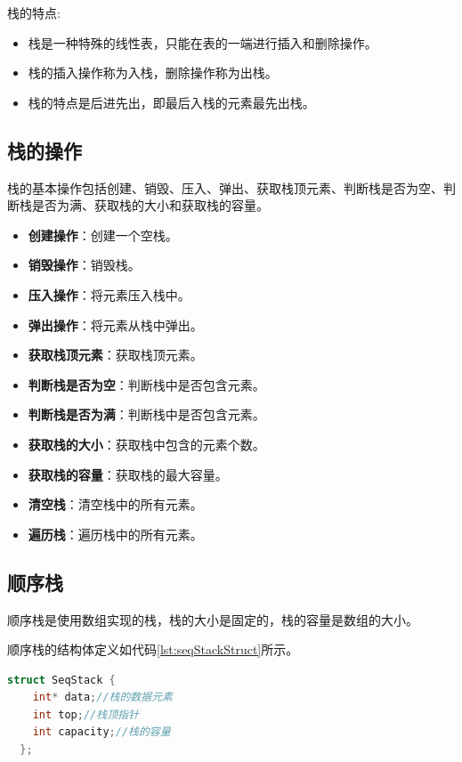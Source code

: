 \documentclass[lang=cn,newtx,10pt,scheme=chinese]{../elegantbook}
\begin{document}
栈的特点:

\begin{itemize}
  \item 栈是一种特殊的线性表，只能在表的一端进行插入和删除操作。
  \item 栈的插入操作称为入栈，删除操作称为出栈。
  \item 栈的特点是后进先出，即最后入栈的元素最先出栈。
\end{itemize}
\subsection{栈的操作}

栈的基本操作包括创建、销毁、压入、弹出、获取栈顶元素、判断栈是否为空、判断栈是否为满、获取栈的大小和获取栈的容量。

\begin{itemize}
  \item \textbf{创建操作}：创建一个空栈。
  \item \textbf{销毁操作}：销毁栈。
  \item \textbf{压入操作}：将元素压入栈中。
  \item \textbf{弹出操作}：将元素从栈中弹出。
  \item \textbf{获取栈顶元素}：获取栈顶元素。
  \item \textbf{判断栈是否为空}：判断栈中是否包含元素。
  \item \textbf{判断栈是否为满}：判断栈中是否包含元素。
  \item \textbf{获取栈的大小}：获取栈中包含的元素个数。
  \item \textbf{获取栈的容量}：获取栈的最大容量。
  \item \textbf{清空栈}：清空栈中的所有元素。
  \item \textbf{遍历栈}：遍历栈中的所有元素。
\end{itemize}


\subsection{顺序栈}

顺序栈是使用数组实现的栈，栈的大小是固定的，栈的容量是数组的大小。

顺序栈的结构体定义如代码\ref{lst:seqStackStruct}所示。

\begin{lstlisting}[language=C++, caption={顺序栈结构体定义}, label={lst:seqStackStruct}]
  struct SeqStack {
    int* data;//栈的数据元素
    int top;//栈顶指针
    int capacity;//栈的容量
  };
\end{lstlisting}
\end{document}
